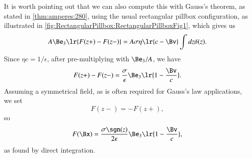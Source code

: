 It is worth pointing out that we can also compute this with Gauss's theorem, as stated in \cref{thm:amperes:280}, using the usual rectangular pillbox configuration, as illustrated in \cref{fig:RectangularPillbox:RectangularPillboxFig1}, which gives us
\begin{equation}\label{eqn:statics_infinitePlane:340}
A \Be_3 \lr{ F(z+) - F(z-) } = A \sigma \eta \lr{ c - \Bv } \int dz \delta(z).
\end{equation}
Since \( \eta c = 1/\epsilon \), after pre-multiplying with \( \Be_3/A \), we have
\begin{equation}\label{eqn:statics_infinitePlane:360}
F(z+) - F(z-) = \frac{\sigma}{\epsilon} \Be_3 \lr{ 1 - \frac{\Bv}{c} }.
\end{equation}
Assuming a symmetrical field, as is often required for Gauss's law applications, we set
\begin{equation}\label{eqn:statics_infinitePlane:380}
F(z-) = -F(z+),
\end{equation}
so
\begin{equation}\label{eqn:statics_infinitePlane:400}
F(\Bx) = \frac{\sigma \sgn(z) }{2 \epsilon} \Be_3 \lr{ 1 - \frac{\Bv}{c} },
\end{equation}
as found by direct integration.

